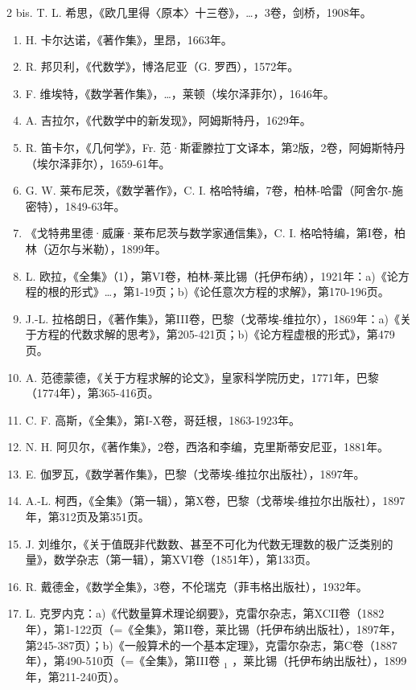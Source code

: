 2 bis. T. L. 希思，《欧几里得〈原本〉十三卷》，\ldots，3卷，剑桥，1908年。

\begin{enumerate}
\def\labelenumi{\arabic{enumi}.}
\setcounter{enumi}{2}
\item
  H. 卡尔达诺，《著作集》，里昂，1663年。
\item
  R. 邦贝利，《代数学》，博洛尼亚（G. 罗西），1572年。
\item
  F. 维埃特，《数学著作集》，\ldots，莱顿（埃尔泽菲尔），1646年。
\item
  A. 吉拉尔，《代数学中的新发现》，阿姆斯特丹，1629年。
\item
  R. 笛卡尔，《几何学》，Fr. 范·斯霍滕拉丁文译本，第2版，2卷，阿姆斯特丹（埃尔泽菲尔），1659-61年。
\item
  G. W. 莱布尼茨，《数学著作》，C. I. 格哈特编，7卷，柏林-哈雷（阿舍尔-施密特），1849-63年。
\item
  《戈特弗里德·威廉·莱布尼茨与数学家通信集》，C. I. 格哈特编，第I卷，柏林（迈尔与米勒），1899年。
\item
  L. 欧拉，《全集》（1），第VI卷，柏林-莱比锡（托伊布纳），1921年：a)《论方程的根的形式》\ldots，第1-19页；b)《论任意次方程的求解》，第170-196页。
\item
  J.-L. 拉格朗日，《著作集》，第III卷，巴黎（戈蒂埃-维拉尔），1869年：a)《关于方程的代数求解的思考》，第205-421页；b)《论方程虚根的形式》，第479页。
\item
  A. 范德蒙德，《关于方程求解的论文》，皇家科学院历史，1771年，巴黎（1774年），第365-416页。
\item
  C. F. 高斯，《全集》，第I-X卷，哥廷根，1863-1923年。
\item
  N. H. 阿贝尔，《著作集》，2卷，西洛和李编，克里斯蒂安尼亚，1881年。
\item
  E. 伽罗瓦，《数学著作集》，巴黎（戈蒂埃-维拉尔出版社），1897年。
\item
  A.-L. 柯西，《全集》（第一辑），第X卷，巴黎（戈蒂埃-维拉尔出版社），1897年，第312页及第351页。
\item
  J. 刘维尔，《关于值既非代数数、甚至不可化为代数无理数的极广泛类别的量》，数学杂志（第一辑），第XVI卷（1851年），第133页。
\item
  R. 戴德金，《数学全集》，3卷，不伦瑞克（菲韦格出版社），1932年。
\item
  L. 克罗内克：a)《代数量算术理论纲要》，克雷尔杂志，第XCII卷（1882年），第1-122页（=《全集》，第II卷，莱比锡（托伊布纳出版社），1897年，第245-387页）；b)《一般算术的一个基本定理》，克雷尔杂志，第C卷（1887年），第490-510页（=《全集》，第III卷 \(_{1}\) ，莱比锡（托伊布纳出版社），1899年，第211-240页）。

\end{enumerate}
